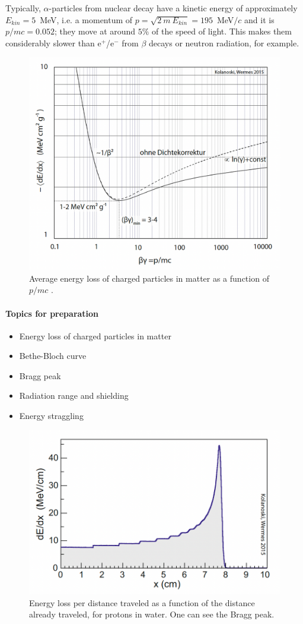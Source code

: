 Typically, $\alpha$-particles from nuclear decay have a kinetic energy of approximately 
$E_{kin} = 5$~MeV, i.e. a momentum of $p = \sqrt{2 \ m \ E_{kin} } = 195$~MeV$/c$ and it is $p/mc = 0.052$; they move at around $5\%$ of the speed of light.
This makes them considerably slower than e$^+$/e$^-$ from $\beta$ decays or neutron radiation, for example. 
%
\begin{figure}[h]
	\centering
	\includegraphics[width=0.7\linewidth]{img/bethe_curve.png}
	\caption{Average energy loss of charged particles in matter as a function of $p/mc$ \cite{kolanoski}.}
	\label{fig:bethecurve}
\end{figure}
%
\paragraph{Topics for preparation}
\begin{itemize}
	\item Energy loss of charged particles in matter
	\item Bethe-Bloch curve
	\item Bragg peak
	\item Radiation range and shielding
	\item Energy straggling
\end{itemize}
%
\begin{figure}[h]
	\centering
	\includegraphics[width=0.7\linewidth]{img/bragg_peak.png}
	\caption{Energy loss per distance traveled as a function of the distance already traveled, for protons in water. One can see the Bragg peak. \cite{kolanoski}}
	\label{fig:braggpeak}
\end{figure}
\FloatBarrier
%
